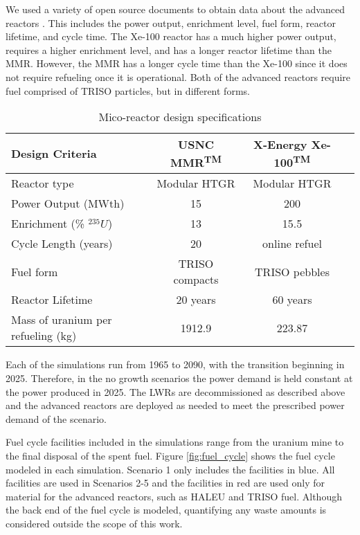 We used a variety of open source documents to obtain data about the advanced reactors
\cite{harlan_x-energy_2018, hussain_advances_2018, mitchell_usnc_2020}. This includes 
the power output, enrichment level, fuel form, reactor lifetime, and cycle time. 
The Xe-100 reactor has a much higher power output, requires a higher enrichment 
level, and has a longer reactor lifetime than the \gls{MMR}. However, the 
\gls{MMR} has a longer cycle time than the Xe-100 since it does not require 
refueling once it is operational. Both of the advanced reactors require fuel 
comprised of \gls{TRISO} particles, but in different forms. 

\begin{table}[ht]
        \caption{Mico-reactor design specifications}
        \label{tab:reactor_summary}
        \begin{tabular}{l c c c}
            \hline
            Design Criteria & \gls{USNC} \gls{MMR}\textsuperscript{TM} & 
                X-Energy Xe-100\textsuperscript{TM} \\\hline
            Reactor type & Modular HTGR & Modular HTGR \\
            Power Output (MWth) & 15 & 200 \\
            Enrichment (\% $^{235}U$) & 13 & 15.5 \\
            Cycle Length (years) & 20 & online refuel\\
            Fuel form & \gls{TRISO} compacts & \gls{TRISO} pebbles\\
            Reactor Lifetime & 20 years & 60 years \\
            Mass of uranium per refueling (kg) & 1912.9 & 223.87 \\
            \hline
        \end{tabular}
    \end{table}

Each of the simulations run from 1965 to 2090, with the transition beginning 
in 2025. Therefore, in the no growth scenarios the power demand is held constant 
at the power produced in 2025. The \glspl{LWR} are decommissioned as described 
above and the advanced reactors are deployed as needed to meet the prescribed 
power demand of the scenario. 

Fuel cycle facilities included in the simulations
range from the uranium mine to the final disposal of the spent fuel. Figure 
\ref{fig:fuel_cycle} shows the fuel cycle modeled in each simulation. Scenario 
1 only includes the facilities in blue. All facilities are used in Scenarios 
2-5 and the facilities in red are used only for material for the advanced reactors, 
such as \gls{HALEU} and \gls{TRISO} fuel. Although the back end of the fuel 
cycle is modeled, quantifying any waste amounts is considered outside the 
scope of this work. 

